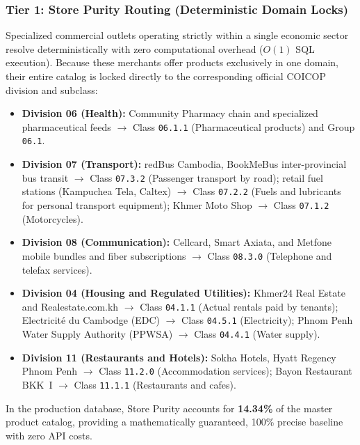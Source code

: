 \subsubsection{Tier 1: Store Purity Routing (Deterministic Domain Locks)}
\hs Specialized commercial outlets operating strictly within a single economic sector resolve deterministically with zero computational overhead ($O(1)$ SQL execution). Because these merchants offer products exclusively in one domain, their entire catalog is locked directly to the corresponding official COICOP division and subclass:
\begin{itemize}[noitemsep]
    \item \textbf{Division 06 (Health):} Community Pharmacy chain and specialized pharmaceutical feeds $\rightarrow$ Class \texttt{06.1.1} (Pharmaceutical products) and Group \texttt{06.1}.
    \item \textbf{Division 07 (Transport):} redBus Cambodia, BookMeBus inter-provincial bus transit $\rightarrow$ Class \texttt{07.3.2} (Passenger transport by road); retail fuel stations (Kampuchea Tela, Caltex) $\rightarrow$ Class \texttt{07.2.2} (Fuels and lubricants for personal transport equipment); Khmer Moto Shop $\rightarrow$ Class \texttt{07.1.2} (Motorcycles).
    \item \textbf{Division 08 (Communication):} Cellcard, Smart Axiata, and Metfone mobile bundles and fiber subscriptions $\rightarrow$ Class \texttt{08.3.0} (Telephone and telefax services).
    \item \textbf{Division 04 (Housing and Regulated Utilities):} Khmer24 Real Estate and Realestate.com.kh $\rightarrow$ Class \texttt{04.1.1} (Actual rentals paid by tenants); Electricit\'e du Cambodge (EDC) $\rightarrow$ Class \texttt{04.5.1} (Electricity); Phnom Penh Water Supply Authority (PPWSA) $\rightarrow$ Class \texttt{04.4.1} (Water supply).
    \item \textbf{Division 11 (Restaurants and Hotels):} Sokha Hotels, Hyatt Regency Phnom Penh $\rightarrow$ Class \texttt{11.2.0} (Accommodation services); Bayon Restaurant BKK~I $\rightarrow$ Class \texttt{11.1.1} (Restaurants and cafes).
\end{itemize}
In the production database, Store Purity accounts for \textbf{14.34\%} of the master product catalog, providing a mathematically guaranteed, 100\% precise baseline with zero API costs.

